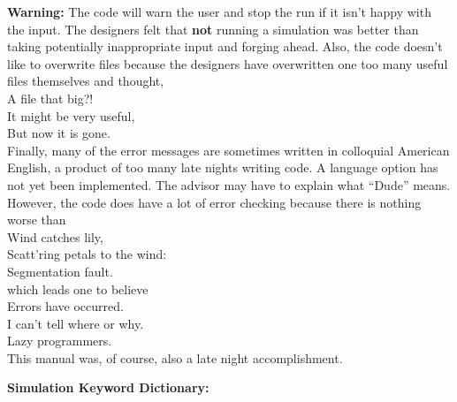 {\bf Warning:} The code will warn the user and stop the run if it isn't happy
with the input. The designers felt that {\bf not} running a
simulation was better than taking potentially inappropriate input 
and forging ahead. 
Also, the code doesn't like to overwrite files because the designers
have overwritten one too many useful files themselves and thought,  \\
\hspace*{1.25in}  A file that big?! \\
\hspace*{1.25in}  It might be very useful,\\
\hspace*{1.25in}  But now it is gone.\\
Finally, many of the error messages are sometimes written in colloquial American English, 
a product of too many late nights writing code. A language option has
not yet been implemented. The advisor may have to explain what
``Dude'' means.  However, the code does have a lot of error
checking because there is nothing worse than \\
\hspace*{1.25in}    Wind catches lily, \\
\hspace*{1.25in}    Scatt'ring petals to the wind:\\
\hspace*{1.25in}    Segmentation fault.\\
which leads one to believe \\
\hspace*{1.25in}  Errors have occurred. \\
\hspace*{1.25in}  I can't tell where or why.\\
\hspace*{1.25in}  Lazy programmers.\\
This manual was, of course, also a late night accomplishment.


\clearpage
\begin{center}
\huge
{\bf Simulation Keyword Dictionary: } 
\end{center}
\LARGE

